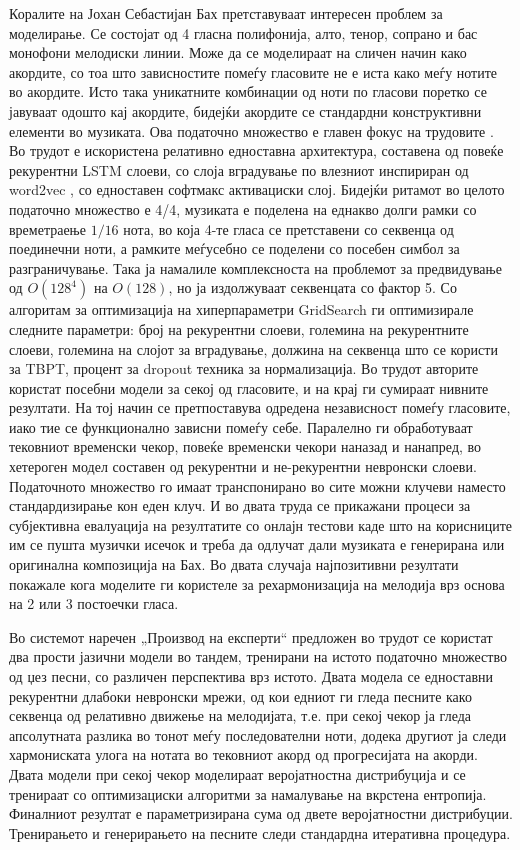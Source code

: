 Коралите на Јохан Себастијан Бах претставуваат интересен проблем за моделирање. Се состојат од 4 гласна полифонија, алто, тенор, сопрано и бас монофони мелодиски линии. Може да се моделираат на сличен начин како акордите, со тоа што зависностите помеѓу гласовите не е иста како меѓу нотите во акордите. Исто така уникатните комбинации од ноти по гласови поретко се јавуваат одошто кај акордите, бидејќи акордите се стандардни конструктивни елементи во музиката. Ова податочно множество е главен фокус на трудовите \cite{Liang2017, Hadjeres2016}. Во трудот \cite{Liang2017} е искористена релативно едноставна архитектура, составена од повеќе рекурентни LSTM слоеви, со слоја вградување по влезниот инспириран од word2vec \cite{Herremans2017}, со едноставен софтмакс активациски слој. Бидејќи ритамот во целото податочно множество е 4/4, музиката е поделена на еднакво долги рамки со времетраење $1/16$ нота, во која 4-те гласа се претставени со секвенца од поединечни ноти, а рамките меѓусебно се поделени со посебен симбол за разграничување. Така ја намалиле комплексноста на проблемот за предвидување од $O(128^4)$ на $O(128)$, но ја издолжуваат секвенцата со фактор 5. Со алгоритам за оптимизација на хиперпараметри GridSearch ги оптимизирале следните параметри: број на рекурентни слоеви, големина на рекурентните слоеви, големина на слојот за вградување, должина на секвенца што се користи за TBPT, процент за dropout техника за нормализација. Во трудот \cite{Hadjeres2016} авторите користат посебни модели за секој од гласовите, и на крај ги сумираат нивните резултати. На тој начин се претпоставува одредена независност помеѓу гласовите, иако тие се функционално зависни помеѓу себе. Паралелно ги обработуваат тековниот временски чекор, повеќе временски чекори наназад и нанапред, во хетероген модел составен од рекурентни и не-рекурентни невронски слоеви. Податочното множество го имаат транспонирано во сите можни клучеви наместо стандардизирање кон еден клуч. И во двата труда се прикажани процеси за субјективна евалуација на резултатите со онлајн тестови каде што на корисниците им се пушта музички исечок и треба да одлучат дали музиката е генерирана или оригинална композиција на Бах. Во двата случаја најпозитивни резултати покажале кога моделите ги користеле за рехармонизација на мелодија врз основа на 2 или 3 постоечки гласа.

Во системот наречен „Производ на експерти“ предложен во трудот \cite{Johnson2017} се користат два прости јазични модели во тандем, тренирани на истото податочно множество од џез песни, со различен перспектива врз истото. Двата модела се едноставни рекурентни длабоки невронски мрежи, од кои едниот ги гледа песните како секвенца од релативно движење на мелодијата, т.е. при секој чекор ја гледа апсолутната разлика во тонот меѓу последователни ноти, додека другиот ја следи хармониската улога на нотата во тековниот акорд од прогресијата на акорди. Двата модели при секој чекор моделираат веројатностна дистрибуција и се тренираат со оптимизациски алгоритми за намалување на вкрстена ентропија. Финалниот резултат е параметризирана сума од двете веројатностни дистрибуции. Тренирањето и генерирањето на песните следи стандардна итеративна процедура.

